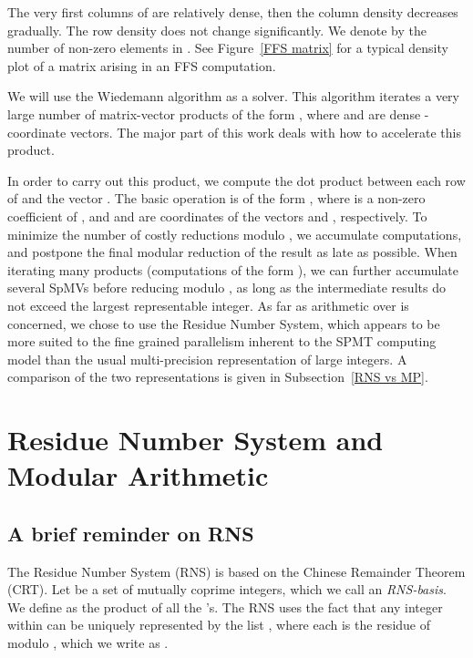 \documentclass[runningheads,orivec]{llncs}
\begin{document}
The very first columns of  are relatively dense, then the column density decreases gradually. The row density does not change significantly. We denote by  the number of non-zero elements in . See Figure~\ref{FFS matrix} for a typical density plot of a matrix arising in an FFS computation.


We will use the Wiedemann algorithm as a solver. This algorithm iterates a very large number of matrix-vector products of the form , where  and  are dense -coordinate vectors. The major part of this work deals with how to accelerate this product.

In order to carry out this product, we compute the dot product between each row of  and the vector . The basic operation is of the form , where  is a non-zero coefficient of , and  and  are coordinates of the vectors  and , respectively. To minimize the number of costly reductions modulo , we accumulate computations, and postpone the final modular reduction of the result as late as possible. When iterating many products (computations of the form ), we can further accumulate several SpMVs before reducing modulo , as long as the intermediate results do not exceed the largest representable integer. As far as arithmetic over  is concerned, we chose to use the Residue Number System, which appears to be more suited to the fine grained parallelism inherent to the SPMT computing model than the usual multi-precision representation of large integers. A comparison of the two representations is given in Subsection~\ref{RNS vs MP}.

\vspace*{-0.25cm}
\section{Residue Number System and Modular Arithmetic}
\label{RNS}

\vspace*{-0.25cm}

\subsection{A brief reminder on RNS}
\vspace*{-0.25cm}

The Residue Number System (RNS) is based on the Chinese Remainder Theorem (CRT). Let  be a set of mutually coprime integers, which we call an \textit{RNS-basis}. We define  as the product of all the 's. The RNS uses the fact that any integer  within  can be uniquely represented by the list , where each  is the residue of  modulo , which we write as . 
\end{document}
